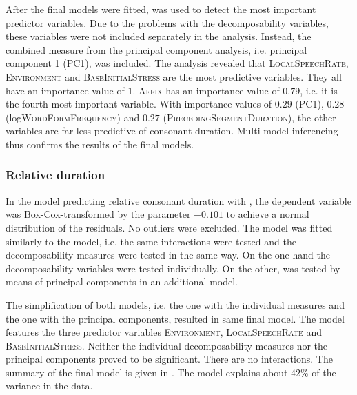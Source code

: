 After the final models were fitted,   was used to detect the most important predictor variables. Due to the  problems with the decomposability variables, these variables were not included separately in the analysis. Instead, the combined  measure from the principal component analysis, i.e. principal component 1 (\textsc{PC1}), was included.
The analysis revealed that \textsc{LocalSpeechRate}, \textsc{Environment} and \textsc{BaseInitialStress} are the most predictive variables. They all have an importance value of $1$. \textsc{Affix} has an importance value of $0.79$, i.e. it is the fourth most important variable. With importance values of $0.29$ (\textsc{PC1}), $0.28$ (log\textsc{WordFormFrequency}) and $0.27$ (\textsc{PrecedingSegmentDuration}), the other variables are far less predictive of consonant duration. Multi-model-inferencing thus confirms the results of the final models.


\subsubsection{Relative duration}

In the model predicting relative consonant duration with , the dependent variable was Box-Cox-transformed by the parameter $-0.101$ to achieve a normal distribution of the residuals. No outliers were excluded. The model was fitted similarly to the  model, i.e. the same interactions were tested and the decomposability measures were tested in the same way. On the one hand the decomposability variables were tested individually. On the other,  was tested by means of principal components in an additional model. 

The simplification of both models, i.e. the one with the individual measures and the one with the principal components, resulted in same final model. The model features the three predictor variables \textsc{Environment}, \textsc{LocalSpeechRate} and \textsc{BaseInitialStress}. Neither the individual decomposability measures nor the principal components proved to be significant. There are no interactions. 
The summary of the final model is given in . The model explains about 42\% of the variance in the data.





